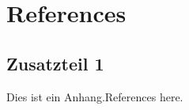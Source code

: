 \newpage
\appendix
\section{References}

\subsection*{Zusatzteil 1} \label{anhang:zusatz1}

Dies ist ein Anhang.References here.

\clearpage